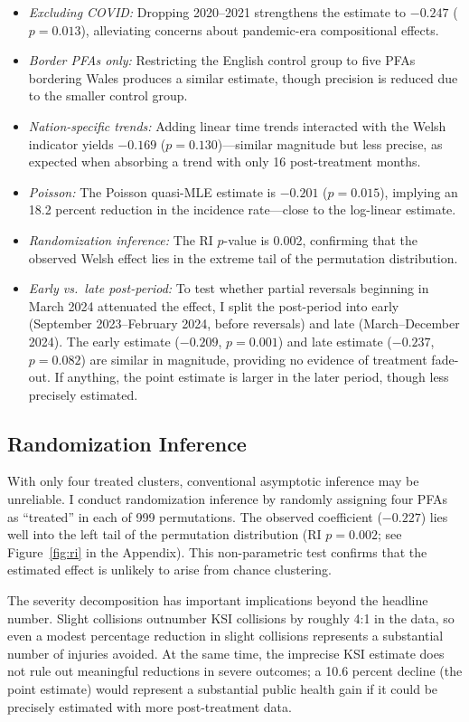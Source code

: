 \documentclass[12pt]{article}
\begin{document}
\begin{itemize}
    \item \textit{Excluding COVID:} Dropping 2020--2021 strengthens the estimate to $-0.247$ ($p = 0.013$), alleviating concerns about pandemic-era compositional effects.
    \item \textit{Border PFAs only:} Restricting the English control group to five PFAs bordering Wales produces a similar estimate, though precision is reduced due to the smaller control group.
    \item \textit{Nation-specific trends:} Adding linear time trends interacted with the Welsh indicator yields $-0.169$ ($p = 0.130$)---similar magnitude but less precise, as expected when absorbing a trend with only 16 post-treatment months.
    \item \textit{Poisson:} The Poisson quasi-MLE estimate is $-0.201$ ($p = 0.015$), implying an 18.2 percent reduction in the incidence rate---close to the log-linear estimate.
    \item \textit{Randomization inference:} The RI $p$-value is 0.002, confirming that the observed Welsh effect lies in the extreme tail of the permutation distribution.
    \item \textit{Early vs.\ late post-period:} To test whether partial reversals beginning in March 2024 attenuated the effect, I split the post-period into early (September 2023--February 2024, before reversals) and late (March--December 2024). The early estimate ($-0.209$, $p = 0.001$) and late estimate ($-0.237$, $p = 0.082$) are similar in magnitude, providing no evidence of treatment fade-out. If anything, the point estimate is larger in the later period, though less precisely estimated.
\end{itemize}

\subsection{Randomization Inference}

With only four treated clusters, conventional asymptotic inference may be unreliable. I conduct randomization inference by randomly assigning four PFAs as ``treated'' in each of 999 permutations. The observed coefficient ($-0.227$) lies well into the left tail of the permutation distribution (RI $p = 0.002$; see Figure~\ref{fig:ri} in the Appendix). This non-parametric test confirms that the estimated effect is unlikely to arise from chance clustering.

The severity decomposition has important implications beyond the headline number. Slight collisions outnumber KSI collisions by roughly 4:1 in the data, so even a modest percentage reduction in slight collisions represents a substantial number of injuries avoided. At the same time, the imprecise KSI estimate does not rule out meaningful reductions in severe outcomes; a 10.6 percent decline (the point estimate) would represent a substantial public health gain if it could be precisely estimated with more post-treatment data.
\end{document}

